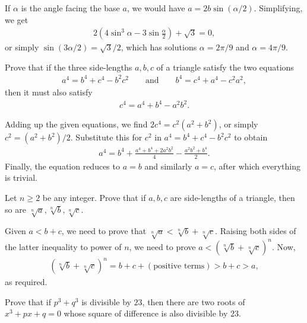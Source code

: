 \documentclass[12pt,a4paper]{memoir}
\theoremstyle{definition}
\begin{document}
\begin{solution}
	If $\alpha$ is the angle facing the base $a$, we would have $a= 2b \sin(\alpha/2)$. Simplifying, we get
	\begin{align*}
		2\left(4\sin^3 \alpha - 3\sin \frac{\alpha}{2}\right) + \sqrt{3} = 0,
	\end{align*}
	or simply $\sin(3\alpha/2)=\sqrt{3}/2$, which has solutions $\alpha=2\pi/9$ and $\alpha=4\pi/9$.
\end{solution}

\begin{question}
	Prove that if the three side-lengths $a,b,c$ of a triangle satisfy the two equations
	\begin{align*}
		a^4 = b^4 + c^4 - b^2c^2 \qquad \text{and} \qquad b^4 = c^4 + a^4 - c^2a^2,
	\end{align*}
	then it must also satisfy
	\begin{align*}
		c^4=a^4+b^4-a^2b^2.
	\end{align*}
\end{question}

\begin{solution}
	Adding up the given equations, we find $2c^4=c^2(a^2+b^2)$, or simply $c^2=(a^2+b^2)/2$. Substitute this for $c^2$ in $a^4 = b^4 + c^4 - b^2c^2$ to obtain
	\begin{align*}
		a^4 = b^4 + \frac{a^4+b^4+2a^2b^2}{4}-\frac{a^2b^2+b^4}{2}.
	\end{align*}
	Finally, the equation reduces to $a=b$ and similarly $a=c$, after which everything is trivial.
\end{solution}


\begin{question}
	Let $n\geq 2$ be any integer. Prove that if $a,b,c$ are side-lengths of a triangle, then so are $\sqrt[n]{a}, \sqrt[n]{b}, \sqrt[n]{c}$.
\end{question}

\begin{solution}
	Given $a<b+c$, we need to prove that $\sqrt[n]{a}<\sqrt[n]{b}+\sqrt[n]{c}$. Raising both sides of the latter inequality to power of $n$, we need to prove $a < \left(\sqrt[n]{b}+\sqrt[n]{c}\right)^n$. Now,
	\begin{align*}
		\left(\sqrt[n]{b}+\sqrt[n]{c}\right)^n = b+c + (\text{positive terms}) > b+c > a,
	\end{align*}
	as required.
\end{solution}

\begin{question}
	Prove that if $p^3+q^3$ is divisible by $23$, then there are two roots of $x^3+px+q=0$ whose square of difference is also divisible by $23$.
\end{question}
\end{document}
